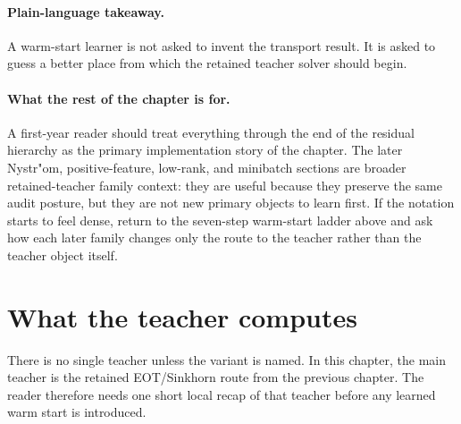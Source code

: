 \paragraph{Plain-language takeaway.}
A warm-start learner is not asked to invent the transport result.  It is asked
to guess a better place from which the retained teacher solver should begin.

\paragraph{What the rest of the chapter is for.}
A first-year reader should treat everything through the end of the residual
hierarchy as the primary implementation story of the chapter.  The later Nystr"om,
positive-feature, low-rank, and minibatch sections are broader retained-teacher
family context: they are useful because they preserve the same audit posture, but
they are not new primary objects to learn first.  If the notation starts to feel
dense, return to the seven-step warm-start ladder above and ask how each later
family changes only the route to the teacher rather than the teacher object itself.

\section{What the teacher computes}
\label{sec:bf-learned-ot-hierarchy}

There is no single teacher unless the variant is named.  In this chapter, the
main teacher is the retained EOT/Sinkhorn route from the previous chapter.  The
reader therefore needs one short local recap of that teacher before any learned
warm start is introduced.

